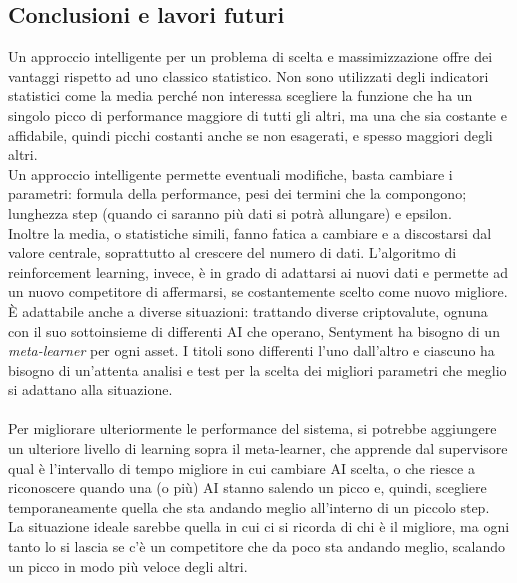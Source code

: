 \documentclass[a4paper,12pt]{report}
\begin{document}
\begin{fig}



\newpage
\chapter{Conclusioni e lavori futuri}
\label{cap5}
Un approccio intelligente per un problema di scelta e massimizzazione offre dei vantaggi rispetto ad uno classico statistico. Non sono utilizzati degli indicatori statistici come la media perché non interessa scegliere la funzione che ha un singolo picco di performance maggiore di tutti gli altri, ma una che sia costante e affidabile, quindi picchi costanti anche se non esagerati, e spesso maggiori degli altri.\\ Un approccio intelligente permette eventuali modifiche, basta cambiare i parametri: formula della performance, pesi dei termini che la compongono; lunghezza step (quando ci saranno più dati si potrà allungare) e epsilon.\\ Inoltre la media, o statistiche simili, fanno fatica a cambiare e a discostarsi dal valore centrale, soprattutto al crescere del numero di dati. L'algoritmo di reinforcement learning, invece, è in grado di adattarsi ai nuovi dati e permette ad un nuovo competitore di affermarsi, se costantemente scelto come nuovo migliore. È adattabile anche a diverse situazioni: trattando diverse criptovalute, ognuna con il suo sottoinsieme di differenti AI che operano, Sentyment ha bisogno di un \textit{meta-learner} per ogni asset. I titoli sono differenti l'uno dall'altro e ciascuno ha bisogno di un'attenta analisi e test per la scelta dei migliori parametri che meglio si adattano alla situazione.
\\~\\Per migliorare ulteriormente le performance del sistema, si potrebbe aggiungere un ulteriore livello di learning sopra il meta-learner, che apprende dal supervisore qual è l'intervallo di tempo migliore in cui cambiare AI scelta, o che riesce a riconoscere quando una (o più) AI stanno salendo un picco e, quindi, scegliere temporaneamente quella che sta andando meglio all'interno di un piccolo step.\\ La situazione ideale sarebbe quella in cui ci si ricorda di chi è il migliore, ma ogni tanto lo si lascia se c'è un competitore che da poco sta andando meglio, scalando un picco in modo più veloce degli altri.

\end{fig}
\end{document}
